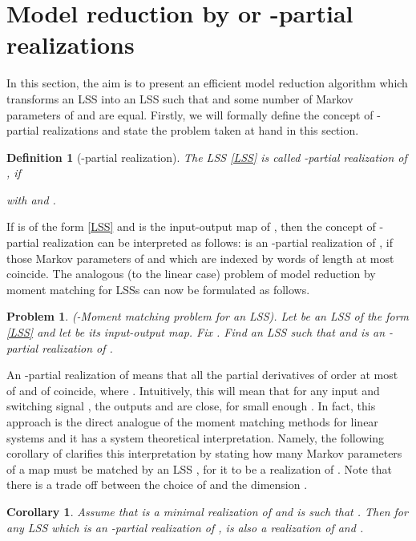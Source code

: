 \documentclass[journal]{IEEEtran}
\newtheorem{Definition}{Definition}
\newtheorem{Corollary}{Corollary}
\newtheorem{Problem}{Problem}
\begin{document}
\section{Model reduction by  or -partial realizations} \label{sect:Npart}

In this section, the aim is to present an efficient  model reduction algorithm which transforms an LSS  into an LSS  such that  and some number of Markov parameters of  and  are equal. Firstly, we will formally define the concept of -partial realizations and state the problem taken at hand in this section.



\begin{Definition}[-partial realization] \label{def:Npartial}
	The LSS \eqref{LSS} is called \emph{-partial realization} of , if
	
	with  and .
\end{Definition}

If  is of the form \eqref{LSS} and  is the input-output map of , then the concept of -partial realization can be interpreted as follows:  is an -partial realization of , if those Markov parameters of  and  which are indexed by words of length at most  coincide. The analogous (to the linear case) problem of model reduction by moment matching for LSSs can now be formulated as follows.

\begin{Problem} \label{prob:momentmatching}
	\emph{(-Moment matching problem for an LSS).}
	Let  be an LSS of the form \eqref{LSS} and let  be its input-output map. Fix . Find an LSS  such that  and  is an -partial realization of .
\end{Problem}

An -partial realization  of  means that all the partial derivatives of order at most  of  and of  coincide, where . Intuitively, this will mean that for any input and switching signal , the outputs  and  are close, for small enough . In fact, this approach is the direct analogue of the moment matching methods for linear systems and it has a system theoretical interpretation. Namely, the following corollary of \cite[Theorem 4]{petreczky} clarifies this interpretation by stating how many Markov parameters of a map  must be matched by an LSS , for it to be a realization of . Note that there is a trade off between the choice of  and the dimension .

\begin{Corollary} \label{cor:rel_N_n}
	Assume that  is a minimal realization of  and  is such that . Then for any LSS  which is an -partial realization of ,  is also a realization of  and .
\end{Corollary}
\end{document}
